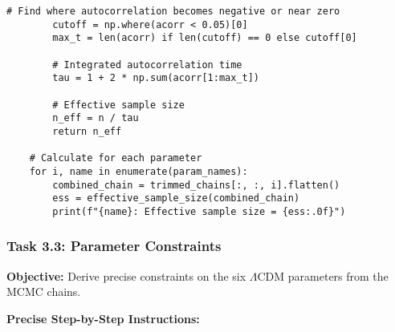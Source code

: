 \documentclass[11pt]{article}
\begin{document}
\begin{enumerate}
\begin{lstlisting}[basicstyle=\small\ttfamily]
        # Find where autocorrelation becomes negative or near zero
        cutoff = np.where(acorr < 0.05)[0]
        max_t = len(acorr) if len(cutoff) == 0 else cutoff[0]
        
        # Integrated autocorrelation time
        tau = 1 + 2 * np.sum(acorr[1:max_t])
        
        # Effective sample size
        n_eff = n / tau
        return n_eff
    
    # Calculate for each parameter
    for i, name in enumerate(param_names):
        combined_chain = trimmed_chains[:, :, i].flatten()
        ess = effective_sample_size(combined_chain)
        print(f"{name}: Effective sample size = {ess:.0f}")
    \end{lstlisting}
\end{enumerate}

\subsubsection{Task 3.3: Parameter Constraints}

\textbf{Objective:} Derive precise constraints on the six $\Lambda$CDM parameters from the MCMC chains.

\textbf{Precise Step-by-Step Instructions:}
\end{document}

